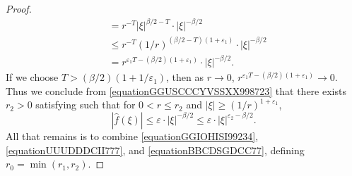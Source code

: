 \documentclass[12pt,reqno]{article}
\numberwithin{equation}{section}
\numberwithin{theorem}{section}
\begin{document}
\begin{proof}
\begin{equation}
\begin{split}
        &= r^{-T} |\xi|^{\beta/2 - T} \cdot |\xi|^{-\beta/2}\\
        &\leq r^{-T} (1/r)^{(\beta/2 - T)(1 + \varepsilon_1)} \cdot |\xi|^{-\beta/2}\\
        &= r^{\varepsilon_1 T - (\beta/2)(1 + \varepsilon_1)} \cdot |\xi|^{-\beta/2}.
    \end{split}
    \end{equation}
    If we choose $T > (\beta/2)(1 + 1/\varepsilon_1)$, then as $r \to 0$, $r^{\varepsilon_1 T - (\beta/2)(1 + \varepsilon_1)} \to 0$. Thus we conclude from \eqref{equationGGUSCCCYVSSXX998723} that there exists $r_2 > 0$ satisfying such that for $0 < r \leq r_2$ and $|\xi| \geq (1/r)^{1+\varepsilon_1}$,
    \begin{equation} \label{equationBBCDSGDCC77}
        |\widehat{f}(\xi)| \leq \varepsilon \cdot |\xi|^{-\beta/2} \leq \varepsilon \cdot |\xi|^{\varepsilon_2-\beta/2}.
    \end{equation}
    All that remains is to combine \eqref{equationGGIOHISI99234}, \eqref{equationUUUDDDCII777}, and \eqref{equationBBCDSGDCC77}, defining $r_0 = \min(r_1,r_2)$.
\end{proof}
\end{document}
